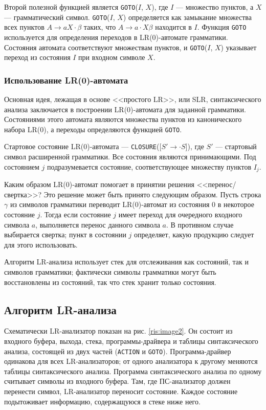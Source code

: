\documentclass[bachelor, och, coursework, times]{SCWorks}
\begin{document}
Второй полезной функцией является \verb|GOTO|($I$, $X$), где $I$ — множество пунктов, а $X$ --- грамматический символ. \verb|GOTO|($I$, $X$) определяется как замыкание множества всех пунктов $A \to aX\cdot \beta$ таких, что $A \to a\cdot X\beta$ находится в $I$. Функция \verb|GOTO| используется для определения переходов в LR(0)-автомате грамматики. Состояния автомата соответствуют множествам пунктов, и \verb|GOTO|($I$, $X$) указывает переход из состояния $I$ при входном символе $X$. 

\subsubsection{Использование LR(0)-автомата }

Основная идея, лежащая в основе <<простого LR>>, или SLR, синтаксического анализа заключается в построении LR(0)-автомата для заданной грамматики. Состояниями этого автомата являются множества пунктов из канонического набора LR(0), а переходы определяются функцией \verb|GOTO|. 

Стартовое состояние LR(0)-автомата --- \verb|CLOSURE|({[$S' \to \cdot S$]}), где $S'$ --- стартовый символ расширенной грамматики. Все состояния являются принимающими. Под состоянием $j$ подразумевается состояние, соответствующее множеству пунктов $I_j$. 

Каким образом LR(0)-автомат помогает в принятии решения \linebreak <<перенос/свертка>>? Это решение может быть принято следующим образом. Пусть строка $\gamma$ из символов грамматики переводит LR(0)-автомат из состояния 0 в некоторое состояние $j$. Тогда если состояние $j$ имеет переход для очередного входного символа $a$, выполняется перенос данного символа $a$. В противном случае выбирается свертка; пункт в состоянии $j$ определяет, какую продукцию следует для этого использовать.~\cite{Sereb}

Алгоритм LR-анализа использует стек для отслеживания как состояний, так и символов грамматики; фактически символы грамматики могут быть восстановлены из состояний, так что стек хранит только состояния.

\subsection{Алгоритм LR-анализа }

Схематически LR-анализатор показан на рис. \ref{ris:image2}. Он состоит из входного буфера, выхода, стека, программы-драйвера и таблицы синтаксического анализа, состоящей из двух частей (\verb|ACTION| и \verb|GOTO|). Программа-драйвер одинакова для всех LR-анализаторов; от одного анализатора к другому меняются таблицы  синтаксического анализа. Программа синтаксического анализа по одному считывает символы из входного буфера. Там, где ПС-анализатор должен перенести символ, LR-анализатор переносит состояние. Каждое состояние подытоживает информацию, содержащуюся в стеке ниже него.
 
\end{document}
